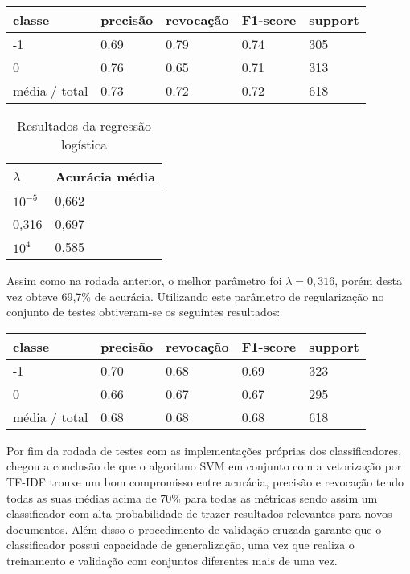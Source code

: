 \begin{table}[H]
	\centering
		\begin{tabular}{l | l | l | l | l}
		\hline
		classe  	&	precisão  &  revocação &  F1-score &  support \\
		\hline
		 -1    &   0.69   &   0.79   &   0.74   &    305 \\
		 \hline
          0    &   0.76   &   0.65   &   0.71   &    313 \\
		\hline
		média / total   &    0.73   &   0.72   &   0.72   &    618 \\
		\hline
	\end{tabular}
\end{table}

\begin{table}[H]
	\centering
	\caption{Resultados da regressão logística}
	\begin{tabular}{l l}
		\hline
		$\lambda$ & Acurácia média \\
		\hline
		$10^{-5}$ & 0,662 \\
		\hline
		0,316 & 0,697 \\
		\hline
		$10^{4}$ & 0,585 \\
	\end{tabular}
\end{table}

Assim como na rodada anterior, o melhor parâmetro foi $\lambda = 0,316$, porém desta vez obteve
69,7\% de acurácia. Utilizando este parâmetro de regularização no conjunto de testes obtiveram-se
os seguintes resultados:

\begin{table}[H]
	\centering
		\begin{tabular}{l | l | l | l | l}
		\hline
		classe  	&	precisão  &  revocação &  F1-score &  support \\
		\hline
		 -1    &   0.70   &   0.68   &   0.69   &    323 \\
		 \hline
          0    &   0.66   &   0.67   &   0.67   &    295 \\
		\hline
		média / total   &    0.68   &   0.68   &   0.68   &    618 \\
		\hline
	\end{tabular}
\end{table}

Por fim da rodada de testes com as implementações próprias dos classificadores, chegou
a conclusão de que o algoritmo SVM em conjunto com a vetorização por TF-IDF trouxe um bom
compromisso entre acurácia, precisão e revocação tendo todas as suas médias acima de 70\%
para todas as métricas sendo assim um classificador com alta probabilidade de trazer resultados
relevantes para novos documentos. Além disso o procedimento de validação cruzada garante
que o classificador possui capacidade de generalização, uma vez que realiza o treinamento e
validação com conjuntos diferentes mais de uma vez.


